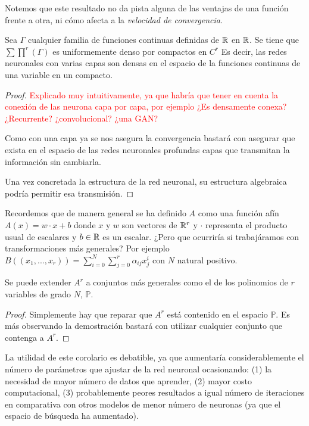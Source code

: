 Notemos que este resultado no da pista alguna de las ventajas de una función frente a otra,
 ni cómo afecta a la \textit{velocidad de convergencia}. 

\begin{corolario}

    Sea $\Gamma$ cualquier familia de funciones continuas definidas de $\mathbb{R}$ en $\mathbb{R}$. 
    Se tiene que $\sum \prod ^r (\Gamma)$ es uniformemente denso por compactos en $C^r$  
    Es decir, las redes neuronales con varias capas son densas en el  espacio de la funciones continuas de una variable en un compacto. 
\end{corolario}
\begin{proof}
    \textcolor{red}{Explicado muy intuitivamente, ya que habría que tener en cuenta la conexión de las neurona 
    capa por capa, por ejemplo ¿Es densamente conexa? ¿Recurrente? ¿convolucional? ¿una GAN?}

    Como con una capa ya se nos asegura la convergencia bastará con asegurar que exista 
    en el espacio de las redes neuronales profundas capas que transmitan la información sin cambiarla. 

    Una vez concretada la estructura de la red neuronal,  su estructura algebraica podría permitir esa transmisión. 
\end{proof}

Recordemos que de manera general se ha definido $A$ como una función afín 
$A(x) = w \cdot x + b$ donde $x$ y $w$ son vectores de $\mathbb{R}^r$ y $\cdot$ representa el producto 
usual de escalares y $b \in \mathbb{R}$ es un escalar.  ¿Pero que ocurriría si trabajáramos con transformaciones más generales?  
Por ejemplo $B((x_1, ..., x_r)) = \sum_{i= 0} ^N \sum_{j= 0} ^r \alpha_{ij} x_j^i$  con $N$ natural positivo. 

\begin{corolario}[Generalización de A]  

    Se puede extender $A^r$ a conjuntos más generales como el de los polinomios de $r$ variables de grado $N$, $\mathbb{P}$.  
\end{corolario}
\begin{proof}
    Simplemente hay que reparar que $A^r$ está contenido en el espacio $\mathbb{P}$. 
    Es más observando la demostración bastará con utilizar cualquier conjunto que contenga a $A^r$. 
\end{proof}

La utilidad de este corolario es debatible, ya que aumentaría considerablemente el número de 
parámetros que ajustar de la red neuronal ocasionando: (1) la necesidad de mayor número de datos que aprender, 
(2) mayor costo computacional, (3) probablemente peores resultados a igual número de iteraciones en comparativa 
con otros modelos de menor número de neuronas (ya que el espacio de búsqueda ha aumentado). 





